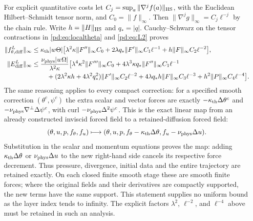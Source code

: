 For explicit quantitative costs let
$C_j=\sup_a\|\nabla^jf(a)\|_{\rm HS}$, with the Euclidean
Hilbert--Schmidt tensor norm, and $C_0=\|f\|_\infty$.
Then $\|\nabla^jg\|_\infty=C_j\ell^{-j}$ by the chain rule. Write
$h=\|H\|_{\rm HS}$ and $q_*=|q|$. Cauchy--Schwarz on the tensor
contractions in \eqref{pd:eq:localtheta} and \eqref{pd:eq:L2} proves
\begin{align}
 \|f^L_{\theta,\mathrm{diff}}\|_\infty
 \leq{}&\kappa_{\rm th}|w\Theta|\big[
 \lambda^2\kappa\|F''\|_\infty C_0
 +2\lambda q_*\|F'\|_\infty C_1\ell^{-1}
 +h\|F\|_\infty C_2\ell^{-2}\big],\label{pd:eq:costtheta}\\
 \|E^L_{\mathrm{diff}}\|_\infty
 \leq{}&\frac{\nu_{\rm phys}|w\Omega|}{\lambda^2\kappa}\big[
 \lambda^4\kappa^2\|F'''\|_\infty C_0
 +4\lambda^3\kappa q_*\|F''\|_\infty C_1\ell^{-1}\notag\\
 &\quad+(2\lambda^2\kappa h+4\lambda^2q_*^2)
       \|F'\|_\infty C_2\ell^{-2}
 +4\lambda q_*h\|F\|_\infty C_3\ell^{-3}
 +h^2\|P\|_\infty C_4\ell^{-4}\big].\label{pd:eq:costomega}
\end{align}
The same reasoning applies to every compact correction: for a specified
smooth correction $(\theta^c,\psi^c)$ the extra scalar and vector forces
are exactly $-\kappa_{\rm th}\Delta\theta^c$ and
$-\nu_{\rm phys}\nabla^\perp\Delta\psi^c$, with curl
$-\nu_{\rm phys}\Delta^2\psi^c$. This is the exact linear map from an already
constructed inviscid forced field to a retained-diffusion forced field:
\begin{equation}\label{pd:eq:force-map}
 (\theta,u,p,f_\theta,f_u)\longmapsto
 (\theta,u,p,f_\theta-\kappa_{\rm th}\Delta\theta,
                      f_u-\nu_{\rm phys}\Delta u).
\end{equation}
Substitution in the scalar and momentum equations proves the map:
adding $\kappa_{\rm th}\Delta\theta$ or $\nu_{\rm phys}\Delta u$ to the new right-hand side
cancels its respective force decrement. Thus pressure, divergence,
initial data and the entire trajectory are retained exactly. On each
closed finite smooth stage these are smooth finite forces; where the
original fields and their derivatives are compactly supported, the new
terms have the same support. This statement supplies no uniform bound
as the layer index tends to infinity. The explicit factors
$\lambda^2$, $\ell^{-2}$, and $\ell^{-4}$ above must be retained in such
an analysis.

